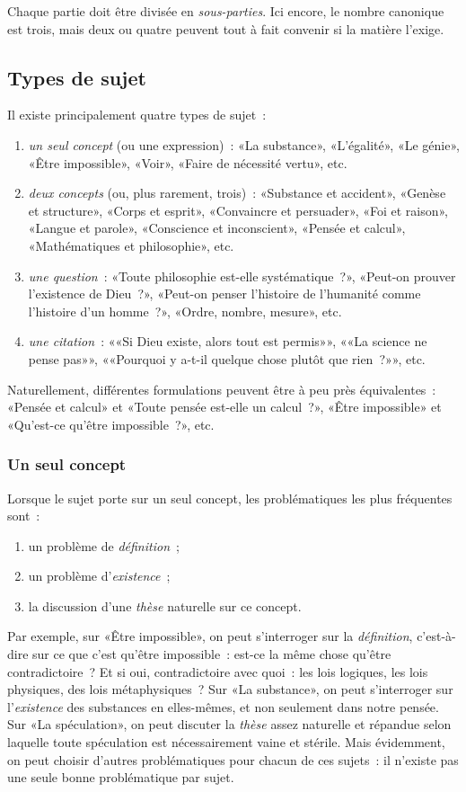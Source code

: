 \documentclass[a4paper,11pt]{article}
\newcommand{\cad}{c'est-à-dire}
\begin{document}
Chaque partie doit être divisée en \emph{sous-parties}. Ici encore, le
nombre canonique est trois, mais deux ou quatre peuvent tout à fait
convenir si la matière l'exige.



\subsection{Types de sujet}

Il existe principalement quatre types de sujet~: 
\begin{enumerate}
\item \emph{un seul concept} (ou une expression)~: «La substance»,
  «L'égalité», «Le génie», «Être impossible», «Voir», «Faire de
  nécessité vertu», etc.
\item \emph{deux concepts} (ou, plus rarement, trois)~: «Substance et
  accident», «Genèse et structure», «Corps et esprit», «Convaincre et
  persuader», «Foi et raison», «Langue et parole», «Conscience et
  inconscient», «Pensée et calcul», «Mathématiques et philosophie», etc.
\item \emph{une question}~: «Toute philosophie est-elle systématique~?»,
  «Peut-on prouver l'existence de Dieu~?», «Peut-on penser l'histoire de
  l'humanité comme l'histoire d'un homme~?», «Ordre, nombre, mesure»,
  etc.
\item \emph{une citation}~: ««Si Dieu existe, alors tout est permis»»,
  ««La science ne pense pas»», ««Pourquoi y a-t-il quelque chose plutôt
  que rien~?»», etc.
\end{enumerate}
Naturellement, différentes formulations peuvent être à peu près
équivalentes~: «Pensée et calcul» et «Toute pensée est-elle un
calcul~?», «Être impossible» et «Qu'est-ce qu'être impossible~?», etc.



\subsubsection{Un seul concept}

Lorsque le sujet porte sur un seul concept, les problématiques les plus
fréquentes sont~:
\begin{enumerate}
\item un problème de \emph{définition}~;
\item un problème d'\emph{existence}~;
\item la discussion d'une \emph{thèse} naturelle sur ce concept.
\end{enumerate}
Par exemple, sur «Être impossible», on peut s'interroger sur la
\emph{définition}, \cad{} sur ce que c'est qu'être impossible~: est-ce
la même chose qu'être contradictoire~?  Et si oui, contradictoire avec
quoi~: les lois logiques, les lois physiques, des lois métaphysiques~?
Sur «La substance», on peut s'interroger sur l'\emph{existence} des
substances en elles-mêmes, et non seulement dans notre pensée. Sur «La
spéculation», on peut discuter la \emph{thèse} assez naturelle et
répandue selon laquelle toute spéculation est nécessairement vaine et
stérile. Mais évidemment, on peut choisir d'autres problématiques pour
chacun de ces sujets~: il n'existe pas une seule bonne problématique par
sujet.
\end{document}
